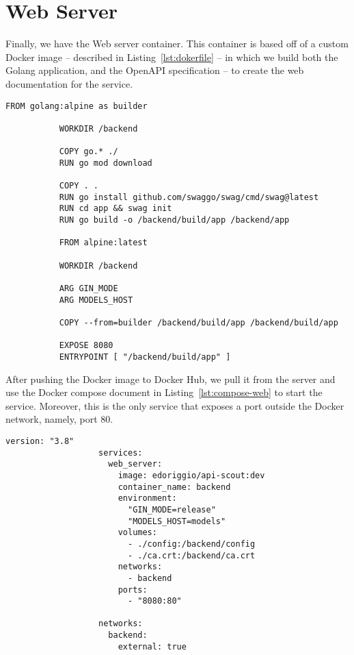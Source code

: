 \section{Web Server}\label{sec:web-server}
Finally, we have the Web server container.
This container is based off of a custom Docker image -- described in Listing~\ref{lst:dokerfile} -- in which we build both the Golang application, and the OpenAPI specification -- to create the web documentation for the service.

\begin{lstlisting}[language=docker,caption={Dockerfile for the web server},label={lst:dokerfile},captionpos=b]
           FROM golang:alpine as builder

           WORKDIR /backend

           COPY go.* ./
           RUN go mod download

           COPY . .
           RUN go install github.com/swaggo/swag/cmd/swag@latest
           RUN cd app && swag init
           RUN go build -o /backend/build/app /backend/app

           FROM alpine:latest

           WORKDIR /backend

           ARG GIN_MODE
           ARG MODELS_HOST

           COPY --from=builder /backend/build/app /backend/build/app

           EXPOSE 8080
           ENTRYPOINT [ "/backend/build/app" ]
\end{lstlisting}

\noindent After pushing the Docker image to Docker Hub, we pull it from the server and use the Docker compose document in Listing~\ref{lst:compose-web} to start the service.
Moreover, this is the only service that exposes a port outside the Docker network, namely, port 80.

\begin{lstlisting}[language=docker-compose,caption={Docker compose for the Web server},label={lst:compose-web},captionpos=b]
                   version: "3.8"
                   services:
                     web_server:
                       image: edoriggio/api-scout:dev
                       container_name: backend
                       environment:
                         "GIN_MODE=release"
                         "MODELS_HOST=models"
                       volumes:
                         - ./config:/backend/config
                         - ./ca.crt:/backend/ca.crt
                       networks:
                         - backend
                       ports:
                         - "8080:80"

                   networks:
                     backend:
                       external: true
\end{lstlisting}

